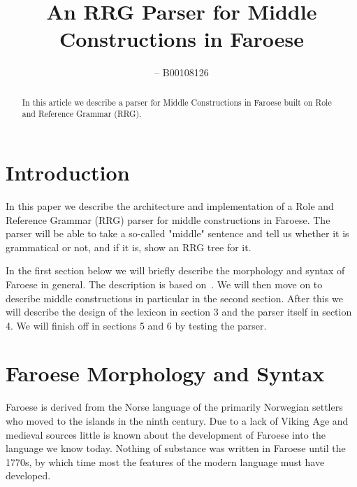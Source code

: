 \documentclass[12pt,%
]{lin-v2/lin}
\begin{document}
    
\leftrunning{}  %

\rightrunning{} %

\title{An RRG Parser for Middle Constructions in Faroese}

\author[1]{  -- B00108126}

\address[1]
{%
  , %
  , %
  , %
}

\maketitle

\begin{abstract}
    In this article we describe a parser for Middle Constructions
    in Faroese built on Role and Reference Grammar (RRG).
\end{abstract}


\section{Introduction}

In this paper we describe the architecture and implementation of a Role and Reference Grammar (RRG)
parser for middle constructions in Faroese. The parser will be able to take a so-called "middle"
sentence and tell us whether it is grammatical or not, and if it is, show an RRG tree for it.

In the first section below we will briefly describe the morphology
and syntax of Faroese in general. The description is based on~\citep{faroese}.
We will then move on to describe middle constructions
in particular in the second section. After this we will describe the design
of the lexicon in section 3 and the parser itself in section 4. We will finish off
in sections 5 and 6 by testing the parser.


\section{Faroese Morphology and Syntax}

Faroese is derived from the Norse language of the primarily Norwegian settlers
who moved to the islands in the ninth century. Due to a lack of Viking Age
and medieval sources little is known about the development of Faroese into
the language we know today. Nothing of substance was written in Faroese
until the 1770s, by which time most the features of the modern language
must have developed.
\end{document}
